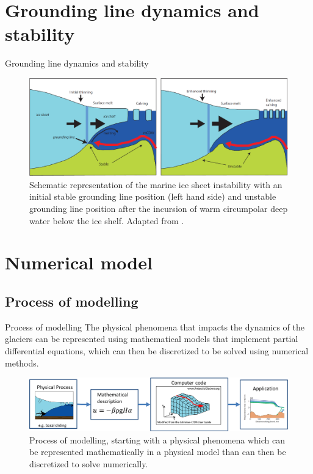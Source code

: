 \documentclass[11pt]{beamer}
\begin{document}
		
	\section{Grounding line dynamics and stability}
		\begin{frame}{Grounding line dynamics and stability}
		\begin{figure}
			\centering
			\includegraphics[scale=0.3]{../fig/GroundingLineInstability.png}
			\caption{Schematic representation of the marine ice sheet instability with an initial stable grounding line position (left hand side) and unstable grounding line position after the incursion of warm circumpolar deep water below the ice shelf. Adapted from \cite{hanna2013white}.}
			\label{grounding_line_instability}
		\end{figure}
		\end{frame}

	\section{Numerical model}
	\subsection{Process of modelling}
	\begin{frame}{Process of modelling}
		\justifying
		The physical phenomena that impacts the dynamics of the glaciers can be represented using mathematical models that implement partial differential equations, which can then be discretized to be solved using numerical methods.
		\begin{figure}
			\centering
			\includegraphics[scale=0.4]{../fig/Numerical_modelling_scheme.png}
			\caption{Process of modelling, starting with a physical phenomena which can be represented mathematically in a physical model than can then be discretized to solve numerically.}
			\label{Modelling}
		\end{figure}
	\end{frame}
\end{document}
